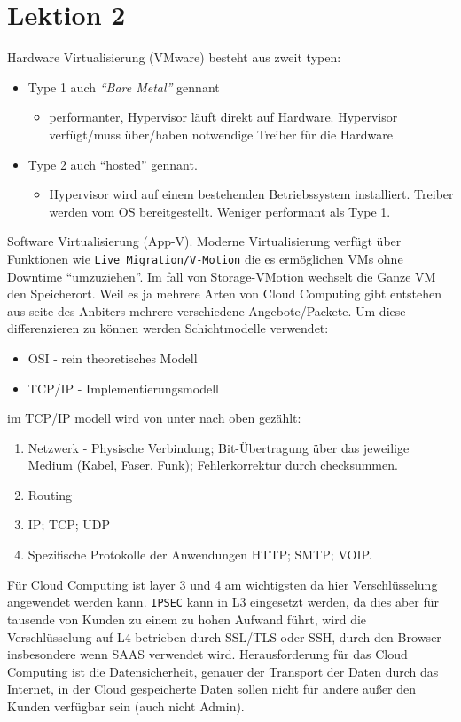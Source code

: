 \documentclass[a4paper,10pt]{article}
\begin{document}
\section{Lektion 2}
Hardware Virtualisierung (VMware) besteht aus zweit typen:
\begin{itemize}
	\item Type 1 auch \textit{``Bare Metal''} gennant
		\begin{itemize}
			\item performanter, Hypervisor läuft direkt auf Hardware. Hypervisor verfügt/muss über/haben notwendige Treiber für die Hardware
		\end{itemize}
	\item Type 2 auch ``hosted'' gennant.
		\begin{itemize}
			\item Hypervisor wird auf einem bestehenden Betriebssystem installiert. Treiber werden vom OS bereitgestellt. Weniger performant als Type 1.
		\end{itemize}
\end{itemize}
Software Virtualisierung (App-V). Moderne Virtualisierung verfügt über Funktionen wie \texttt{Live Migration/V-Motion} die es ermöglichen VMs ohne Downtime ``umzuziehen''. Im fall von Storage-VMotion wechselt die Ganze VM den Speicherort.
\vspace{3mm}
Weil es ja mehrere Arten von Cloud Computing gibt entstehen aus seite des Anbiters mehrere verschiedene Angebote/Packete. Um diese differenzieren zu können werden Schichtmodelle verwendet:
\begin{itemize}
	\item OSI - rein theoretisches Modell
	\item TCP/IP - Implementierungsmodell
\end{itemize}
im TCP/IP modell wird von unter nach oben gezählt:
\begin{enumerate}
	\item Netzwerk - Physische Verbindung; Bit-Übertragung über das jeweilige Medium (Kabel, Faser, Funk); Fehlerkorrektur durch checksummen.
	\item Routing
	\item IP; TCP; UDP
	\item Spezifische Protokolle der Anwendungen HTTP; SMTP; VOIP.
\end{enumerate}
Für Cloud Computing ist layer 3 und 4 am wichtigsten da hier Verschlüsselung angewendet werden kann. \texttt{IPSEC} kann in L3 eingesetzt werden, da dies aber für tausende von Kunden zu einem zu hohen Aufwand führt, wird die Verschlüsselung auf L4 betrieben durch SSL/TLS oder SSH, durch den Browser insbesondere wenn SAAS verwendet wird. Herausforderung für das Cloud Computing ist die Datensicherheit, genauer der Transport der Daten durch das Internet, in der Cloud gespeicherte Daten sollen nicht für andere außer den Kunden verfügbar sein (auch nicht Admin).
\end{document}
